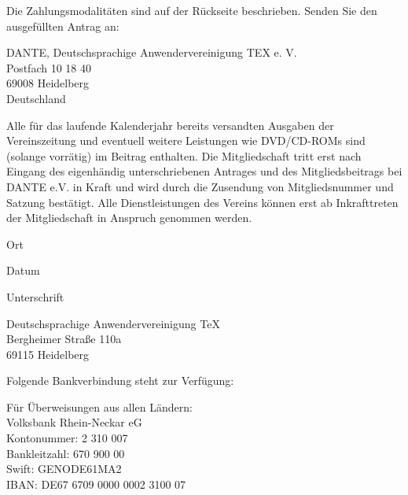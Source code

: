 \documentclass[ngerman,dvips]{article}
\begin{document}
\vspace{1cm}
Die Zahlungsmodalitäten sind auf der Rückseite beschrieben. Senden Sie den ausgefüllten Antrag an:

\vspace{1cm}
DANTE, Deutschsprachige Anwendervereinigung TEX e.\kern-1pt V.\\
Postfach 10 18 40\\
69008 Heidelberg\\
Deutschland



\vspace{1cm}
Alle f\"{u}r das laufende Kalenderjahr bereits versandten Ausgaben der Vereinszeitung und eventuell weitere Leistungen
wie DVD/CD-ROMs sind (solange vorr\"{a}tig) im Beitrag enthalten. Die Mitgliedschaft tritt erst nach Eingang des
eigenh\"{a}ndig unterschriebenen Antrages und des Mitgliedsbeitrags bei DANTE e.V. in Kraft und wird durch die Zusendung
von Mitgliedsnummer und Satzung best\"{a}tigt. Alle Dienstleistungen des Vereins k\"{o}nnen erst ab Inkrafttreten
der Mitgliedschaft in Anspruch genommen werden.


\vspace{22pt}

\begin{minipage}{0.2\textwidth}
\begin{center}
\dotfill

Ort
\end{center}
\end{minipage}\hfill
\begin{minipage}{0.15\textwidth}
\begin{center}
\dotfill

Datum
\end{center}
\end{minipage}\hfill
\begin{minipage}{0.5\textwidth}
\begin{center}
\dotfill

Unterschrift
\end{center}
\end{minipage}


\newpage

\renewcommand\thesubsection{\arabic{subsection}.}

\begin{flushright}
{\Huge\DANTE} \hfill Deutschsprachige Anwendervereinigung \TeX\ \eV\\
Bergheimer Straße 110a\\
69115 Heidelberg
\end{flushright}


Folgende Bankverbindung steht zur Verfügung:

Für Überweisungen aus allen Ländern:\\
Volksbank Rhein-Neckar eG\\
Kontonummer: 2 310 007\\
Bankleitzahl: 670 900 00\\
Swift: GENODE61MA2\\
IBAN: DE67 6709 0000 0002 3100 07
\end{document}
